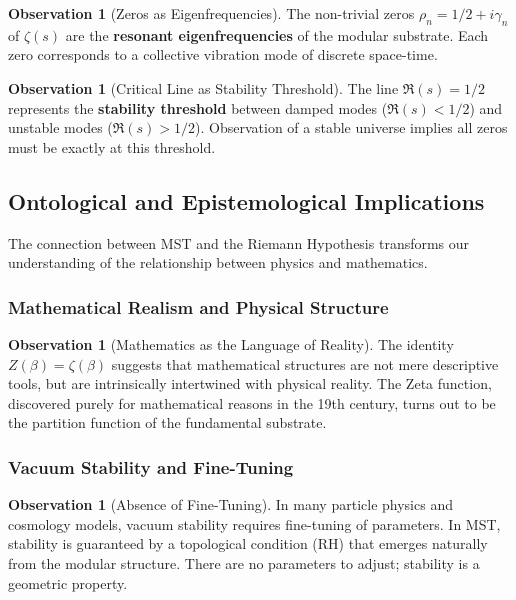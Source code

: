 \documentclass[11pt, a4paper]{article}
\theoremstyle{plain}
\theoremstyle{definition}
\newtheorem{observation}[theorem]{Observation}
\begin{document}
\begin{observation}[Zeros as Eigenfrequencies]
The non-trivial zeros $\rho_n = 1/2 + i\gamma_n$ of $\zeta(s)$ are the \textbf{resonant eigenfrequencies} of the modular substrate. Each zero corresponds to a collective vibration mode of discrete space-time.
\end{observation}

\begin{observation}[Critical Line as Stability Threshold]
The line $\Re(s) = 1/2$ represents the \textbf{stability threshold} between damped modes ($\Re(s) < 1/2$) and unstable modes ($\Re(s) > 1/2$). Observation of a stable universe implies all zeros must be exactly at this threshold.
\end{observation}

\subsection{Ontological and Epistemological Implications}

The connection between MST and the Riemann Hypothesis transforms our understanding of the relationship between physics and mathematics.

\subsubsection{Mathematical Realism and Physical Structure}

\begin{observation}[Mathematics as the Language of Reality]
The identity $Z(\beta) = \zeta(\beta)$ suggests that mathematical structures are not mere descriptive tools, but are intrinsically intertwined with physical reality. The Zeta function, discovered purely for mathematical reasons in the 19th century, turns out to be the partition function of the fundamental substrate.
\end{observation}

\subsubsection{Vacuum Stability and Fine-Tuning}

\begin{observation}[Absence of Fine-Tuning]
In many particle physics and cosmology models, vacuum stability requires fine-tuning of parameters. In MST, stability is guaranteed by a topological condition (RH) that emerges naturally from the modular structure. There are no parameters to adjust; stability is a geometric property.
\end{observation}
\end{document}
